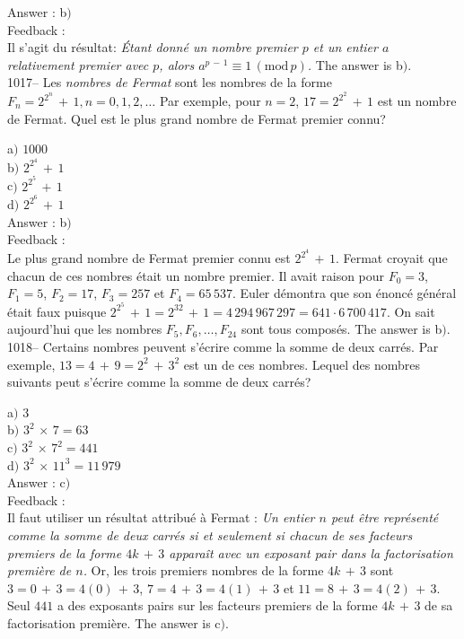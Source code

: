 ﻿\documentclass[letterpaper, 12pt]{article}
\begin{document}
Answer : b$)$\\

Feedback : \\
Il s'agit du r\'esultat: {\sl \'Etant donn\'e un nombre premier $p$
et un entier $a$ relativement premier avec $p$, alors
$a^{p\,-\,1}\equiv1\,(\mathrm{mod}\,p)$.}
The answer is b$)$.\\

1017-- Les {\sl nombres de Fermat} sont les nombres de la forme
$F_n=2^{2^n}\,+\,1, n=0,1,2,\ldots$ Par exemple, pour $n=2$,
$17=2^{2^2}\,+\,1$ est un nombre de Fermat. Quel est le plus grand
nombre de Fermat premier connu?

a$)$ $1000$ \\
b$)$ $2^{2^4}\,+\,1$ \\
c$)$ $2^{2^5}\,+\,1$ \\
d$)$ $2^{2^6}\,+\,1$\\

Answer : b$)$\\

Feedback : \\
Le plus grand nombre de Fermat premier connu est $2^{2^4}\,+\,1$.
Fermat croyait que chacun de ces nombres \'etait un nombre premier.
Il avait raison pour $F_0=3$, $F_1=5$, $F_2=17$, $F_3=257$ et
$F_4=65\,537$. Euler d\'emontra que son \'enonc\'e g\'en\'eral
\'etait faux puisque
$2^{2^5}\,+\,1=2^{32}\,+\,1=4\,294\,967\,297=641\cdot6\,700\,417$.
On sait aujourd'hui que les nombres $F_5,F_6,\ldots,F_{24}$ sont
tous compos\'es.
The answer is b$)$.\\

1018-- Certains nombres peuvent s'\'ecrire comme la somme de deux
carr\'es. Par exemple, $13=4\,+\,9=2^2\,+\,3^2$ est un de ces
nombres. Lequel des nombres suivants peut s'\'ecrire comme la somme
de deux carr\'es?

a$)$ $3$ \\
b$)$ $3^2\,\times\,7=63$\\
c$)$ $3^2\,\times\,7^2=441$ \\
d$)$ $3^2\,\times\,11^3=11\,979$\\

Answer : c$)$\\

Feedback : \\
Il faut utiliser un r\'esultat attribu\'e \`a Fermat : {\sl Un
entier $n$ peut \^etre repr\'esent\'e comme la somme de deux
carr\'es si et seulement si chacun de ses facteurs premiers de la
forme $4k\,+\,3$ appara\^it avec un exposant pair dans la
factorisation premi\`ere de $n$.} Or, les trois premiers nombres de
la forme $4k\,+\,3$ sont $3=0\,+\,3=4(0)\,+\,3$,
$7=4\,+\,3=4(1)\,+\,3$ et $11=8\,+\,3=4(2)\,+\,3$. Seul $441$ a des
exposants pairs sur les facteurs premiers de la forme $4k\,+\,3$ de
sa factorisation premi\`ere.
The answer is c$)$.\\
\end{document}

